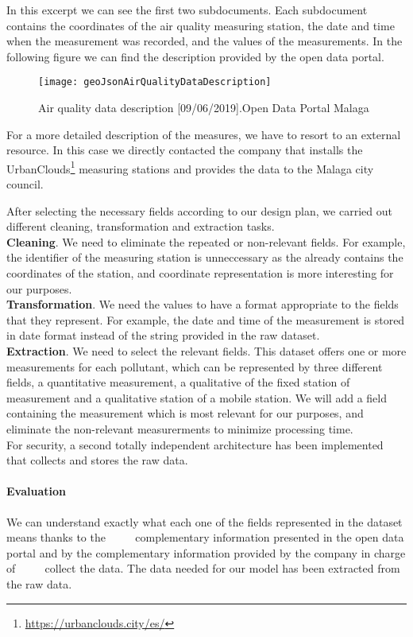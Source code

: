     In this excerpt we can see the first two subdocuments. Each subdocument contains the coordinates of the air quality 
    measuring station, the date and time when the measurement was recorded, and the values of the measurements.
    In the following figure we can find the description provided by the open data portal.
\begin{figure}[ht]
    \centering
    \texttt{[image: geoJsonAirQualityDataDescription]}
    \caption{Air quality data description [09/06/2019].Open Data Portal Malaga}
\end{figure}


For a more detailed description of the measures, we have to resort to an external resource. In this case we directly contacted 
the company that installs the UrbanClouds\footnote{\url{https://urbanclouds.city/es/}} measuring stations and provides the data 
to the Malaga city council.

After selecting the necessary fields according to our design plan, we carried out different cleaning, transformation and extraction tasks. \\


\textbf{Cleaning}. We need to eliminate the repeated or non-relevant fields. For example, the identifier of the measuring station is 
unneccessary as the  already contains the coordinates of the station, and coordinate representation is more interesting for our purposes. \\

\textbf{Transformation}. We need the values to have a format appropriate to the fields that they represent. For example, the date and time 
of the measurement is stored in date format
instead of the string provided in the raw dataset. \\

\textbf{Extraction}. We need to select the relevant fields. This dataset offers one or more measurements for each pollutant, which can be 
represented by three different fields, a
quantitative measurement, a qualitative of the fixed station of measurement and a qualitative station of a mobile station. We will add a 
field containing the measurement which is most relevant for our purposes, and eliminate the non-relevant measurerments to minimize processing time. \\

For security, a second totally independent architecture has been implemented that collects and stores the raw data.

\paragraph{Evaluation} \mbox{} 
\begin{itemize}
    \done We can understand exactly what each one of the fields represented in the dataset means thanks to the 
         complementary information presented in the open data portal and by the complementary information provided by the company in charge of
         collect the data.
    \done The data needed for our model has been extracted from the raw data.
    
\end{itemize}
\newpage
